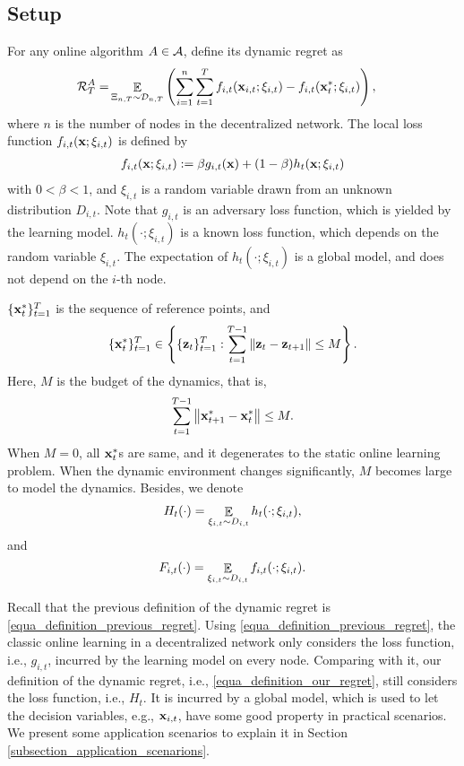 \documentclass{article}
\begin{document}
\subsection{Setup}
For any online algorithm $A \in {\mathcal{A}}$, define its dynamic regret as
\begin{align}
\label{equa_definition_our_regret}
{\mathcal{R}}_T^{A} = & \mathop{\mathbb{E}}_{ \Xi_{n,T} \sim \mathcal{D}_{n,T} } \left(  \sum_{i=1}^n\sum_{t=1}^T f_{i,t}({\bf x}_{i,t};\xi_{i,t}) - f_{i,t}({\bf x}_t^\ast;\xi_{i,t})  \right),
\end{align} where $n$ is the number of nodes in the decentralized network. The local loss function $f_{i,t}({\bf x};\xi_{i,t})$ is defined by
\begin{align}
\nonumber
f_{i,t}({\bf x};\xi_{i,t}) := \beta g_{i,t}({\bf x}) + (1-\beta) h_t({\bf x}; \xi_{i,t})
\end{align} with $0<\beta<1$, and $\xi_{i,t}$ is a random variable drawn from an unknown distribution $D_{i,t}$. Note that $g_{i,t}$ is an adversary loss function, which is yielded by the learning model. $h_t(\cdot; \xi_{i,t})$ is a known loss function, which   depends on the random variable $\xi_{i,t}$. The expectation of $h_t(\cdot; \xi_{i,t})$ is a global model, and does not depend on the $i$-th node. 

$\{{\bf x}_t^\ast\}_{t=1}^T$ is the sequence of reference points, and 
\begin{align}
\nonumber
\{{\bf x}_t^\ast\}_{t=1}^T \in \left\{ \{{\bf z}_t\}_{t=1}^{T} : \sum_{t=1}^{T-1} \left\lVert{\bf z}_t - {\bf z}_{t+1}\right\rVert \le M \right\}.
\end{align} Here, $M$ is the budget of the dynamics, that is,
\begin{align}
\label{equa_define_M}
\sum_{t=1}^{T-1} \left\lVert{\bf x}_{t+1}^\ast - {\bf x}_t^\ast\right\rVert \le M.
\end{align} When $M=0$, all ${\bf x}_t^\ast$s are same, and it degenerates to the static online learning problem. When the dynamic environment changes significantly, $M$ becomes large to model the dynamics.  Besides, we denote 
\begin{align}
\nonumber
H_t(\cdot) = \mathop{\mathbb{E}}_{\xi_{i,t} \sim D_{i,t}} h_t(\cdot; \xi_{i,t}),
\end{align} and 
\begin{align}
\nonumber
F_{i,t}(\cdot) = \mathop{\mathbb{E}}_{\xi_{i,t} \sim D_{i,t}} f_{i,t}(\cdot; \xi_{i,t}).
\end{align}




{\color{blue}

Recall that the previous definition of the dynamic regret is \eqref{equa_definition_previous_regret}. Using \eqref{equa_definition_previous_regret}, the classic online learning in a decentralized network only considers the loss function, i.e., $g_{i,t}$, incurred by the learning model on every node. Comparing with it, our definition of the dynamic regret, i.e., \eqref{equa_definition_our_regret}, still considers the loss function, i.e., $H_t$. It is incurred by a global model, which is used to let the decision variables, e.g., ${\bf x}_{i,t}$, have some good property in practical scenarios.  We present some application scenarios to explain it in Section \ref{subsection_application_scenarions}. 
}
\end{document}
